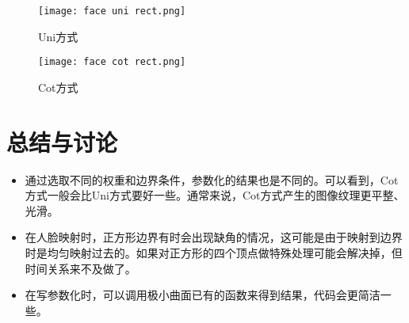 \documentclass{article}
\begin{document}
         	\begin{figure}
         	\begin{minipage}[H]{0.5\linewidth}
         		\centering
         		\texttt{[image: face uni rect.png]}
         		\caption{Uni方式}
         	\end{minipage}%
         	\begin{minipage}[H]{0.5\linewidth}
         		\centering
         		\texttt{[image: face cot rect.png]}
         		\caption{Cot方式}
         	\end{minipage}
         \end{figure}
         
	
	\section{总结与讨论}
	
	   \begin{itemize}
		\item  通过选取不同的权重和边界条件，参数化的结果也是不同的。可以看到，Cot方式一般会比Uni方式要好一些。通常来说，Cot方式产生的图像纹理更平整、光滑。
	\end{itemize}

   \begin{itemize}
	\item  在人脸映射时，正方形边界有时会出现缺角的情况，这可能是由于映射到边界时是均匀映射过去的。如果对正方形的四个顶点做特殊处理可能会解决掉，但时间关系来不及做了。
\end{itemize}

   \begin{itemize}
	\item  在写参数化时，可以调用极小曲面已有的函数来得到结果，代码会更简洁一些。
\end{itemize}
	
\end{document}

